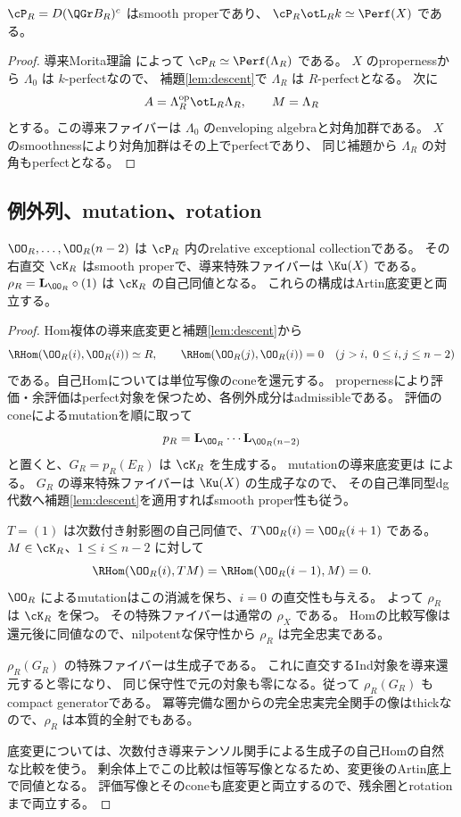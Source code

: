 \begin{corollary}\label{cor:smooth-proper}
 \(\cP_R=D(\QGr B_R)^c\) はsmooth properであり、
 \(\cP_R\otL_Rk\simeq\Perf(X)\) である。
\end{corollary}
\begin{proof}
 導来Morita理論 \cite{Keller} によって
 \(\cP_R\simeq\Perf(\Lambda_R)\) である。
 \(X\) のpropernessから \(\Lambda_0\) は \(k\)-perfectなので、
 補題\ref{lem:descent}で \(\Lambda_R\) は \(R\)-perfectとなる。
 次に
 \[
 A=\Lambda_R^{\mathrm{op}}\otL_R\Lambda_R,\qquad M=\Lambda_R
 \]
 とする。この導来ファイバーは \(\Lambda_0\) のenveloping algebraと対角加群である。
 \(X\) のsmoothnessにより対角加群はその上でperfectであり、
 同じ補題から \(\Lambda_R\) の対角もperfectとなる。
\end{proof}

\subsection{例外列、mutation、rotation}

\begin{proposition}\label{prop:relative-pair}
 \(\OO_R,\ldots,\OO_R(n-2)\) は \(\cP_R\) 内のrelative exceptional collectionである。
 その右直交 \(\cK_R\) はsmooth properで、導来特殊ファイバーは \(\Ku(X)\) である。
 \(\rho_R=\mathbf L_{\OO_R}\circ(1)\) は \(\cK_R\) の自己同値となる。
 これらの構成はArtin底変更と両立する。
\end{proposition}
\begin{proof}
 Hom複体の導来底変更と補題\ref{lem:descent}から
 \[
 \RHom(\OO_R(i),\OO_R(i))\simeq R,\qquad
 \RHom(\OO_R(j),\OO_R(i))=0\quad(j>i,\ 0\le i,j\le n-2)
 \]
 である。自己Homについては単位写像のconeを還元する。
 propernessにより評価・余評価はperfect対象を保つため、各例外成分はadmissibleである。
 評価のconeによるmutationを順に取って
 \[
 p_R=\mathbf L_{\OO_R}\cdots\mathbf L_{\OO_R(n-2)}
 \]
 と置くと、\(G_R=p_R(E_R)\) は \(\cK_R\) を生成する。
 mutationの導来底変更は \cite[Lemma 5.14]{DDL} による。
 \(G_R\) の導来特殊ファイバーは \(\Ku(X)\) の生成子なので、
 その自己準同型dg代数へ補題\ref{lem:descent}を適用すればsmooth proper性も従う。

 \(T=(1)\) は次数付き射影圏の自己同値で、\(T\OO_R(i)=\OO_R(i+1)\) である。
 \(M\in\cK_R\)、\(1\le i\le n-2\) に対して
 \[
 \RHom(\OO_R(i),TM)=\RHom(\OO_R(i-1),M)=0.
 \]
 \(\OO_R\) によるmutationはこの消滅を保ち、\(i=0\) の直交性も与える。
 よって \(\rho_R\) は \(\cK_R\) を保つ。
 その特殊ファイバーは通常の \(\rho_X\) である。
 Homの比較写像は還元後に同値なので、nilpotentな保守性から
 \(\rho_R\) は完全忠実である。

 \(\rho_R(G_R)\) の特殊ファイバーは生成子である。
 これに直交するInd対象を導来還元すると零になり、
 同じ保守性で元の対象も零になる。従って \(\rho_R(G_R)\) もcompact generatorである。
 冪等完備な圏からの完全忠実完全関手の像はthickなので、\(\rho_R\) は本質的全射でもある。

 底変更については、次数付き導来テンソル関手による生成子の自己Homの自然な比較を使う。
 剰余体上でこの比較は恒等写像となるため、変更後のArtin底上で同値となる。
 評価写像とそのconeも底変更と両立するので、残余圏とrotationまで両立する。
\end{proof}

